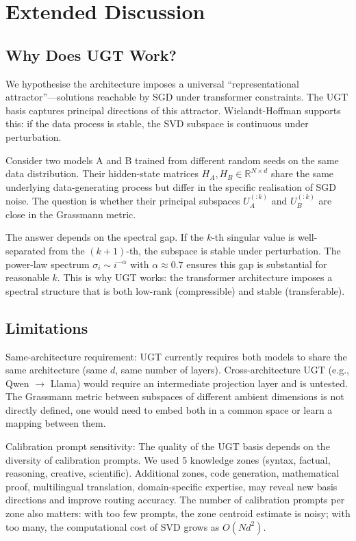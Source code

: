 \documentclass[11pt]{article}
\begin{document}
\section{Extended Discussion}

\subsection{Why Does UGT Work?}
We hypothesise the architecture imposes a universal ``representational attractor''---solutions reachable by SGD under transformer constraints. The UGT basis captures principal directions of this attractor. Wielandt-Hoffman supports this: if the data process is stable, the SVD subspace is continuous under perturbation.

Consider two models A and B trained from different random seeds on the same data distribution. Their hidden-state matrices $H_A, H_B \in \mathbb{R}^{N \times d}$ share the same underlying data-generating process but differ in the specific realisation of SGD noise. The question is whether their principal subspaces $U_A^{(:k)}$ and $U_B^{(:k)}$ are close in the Grassmann metric.

The answer depends on the spectral gap. If the $k$-th singular value is well-separated from the $(k+1)$-th, the subspace is stable under perturbation. The power-law spectrum $\sigma_i \sim i^{-\alpha}$ with $\alpha \approx 0.7$ ensures this gap is substantial for reasonable $k$. This is why UGT works: the transformer architecture imposes a spectral structure that is both low-rank (compressible) and stable (transferable).

\subsection{Limitations}

Same-architecture requirement: UGT currently requires both models to share the same architecture (same $d$, same number of layers). Cross-architecture UGT (e.g., Qwen $\rightarrow$ Llama) would require an intermediate projection layer and is untested. The Grassmann metric between subspaces of different ambient dimensions is not directly defined, one would need to embed both in a common space or learn a mapping between them.

Calibration prompt sensitivity: The quality of the UGT basis depends on the diversity of calibration prompts. We used 5 knowledge zones (syntax, factual, reasoning, creative, scientific). Additional zones, code generation, mathematical proof, multilingual translation, domain-specific expertise, may reveal new basis directions and improve routing accuracy. The number of calibration prompts per zone also matters: with too few prompts, the zone centroid estimate is noisy; with too many, the computational cost of SVD grows as $O(N d^2)$.
\end{document}
